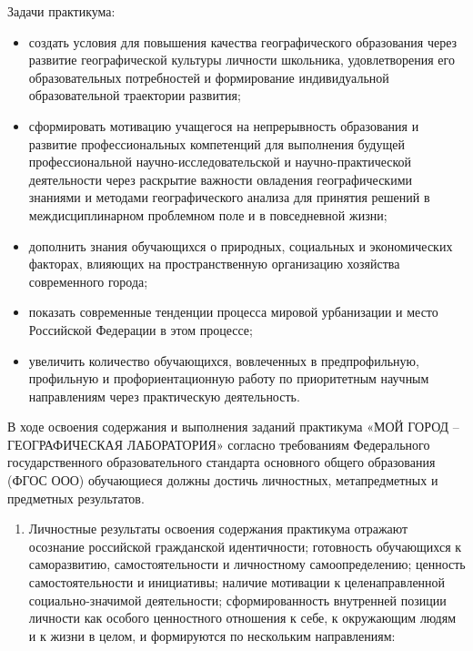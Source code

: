 \documentclass[
  11pt,
  russian,
]{book}
\providecommand{\tightlist}{%
  \setlength{\itemsep}{0pt}\setlength{\parskip}{0pt}}
\begin{document}
Задачи практикума:

\begin{itemize}
\item
  создать условия для повышения качества географического образования через развитие географической культуры личности школьника, удовлетворения его образовательных потребностей и формирование индивидуальной образовательной траектории развития;
\item
  сформировать мотивацию учащегося на непрерывность образования и развитие профессиональных компетенций для выполнения будущей профессиональной научно-исследовательской и научно-практической деятельности через раскрытие важности овладения географическими знаниями и методами географического анализа для принятия решений в междисциплинарном проблемном поле и в повседневной жизни;
\item
  дополнить знания обучающихся о природных, социальных и экономических факторах, влияющих на пространственную организацию хозяйства современного города;
\item
  показать современные тенденции процесса мировой урбанизации и место Российской Федерации в этом процессе;
\item
  увеличить количество обучающихся, вовлеченных в предпрофильную, профильную и профориентационную работу по приоритетным научным направлениям через практическую деятельность.
\end{itemize}

В ходе освоения содержания и выполнения заданий практикума «МОЙ ГОРОД -- ГЕОГРАФИЧЕСКАЯ ЛАБОРАТОРИЯ» согласно требованиям Федерального государственного образовательного стандарта основного общего образования (ФГОС ООО) обучающиеся должны достичь личностных, метапредметных и предметных результатов.

\begin{enumerate}
\def\labelenumi{\arabic{enumi}.}
\tightlist
\item
  Личностные результаты освоения содержания практикума отражают осознание российской гражданской идентичности; готовность обучающихся к саморазвитию, самостоятельности и личностному самоопределению; ценность самостоятельности и инициативы; наличие мотивации к целенаправленной социально-значимой деятельности; сформированность внутренней позиции личности как особого ценностного отношения к себе, к окружающим людям и к жизни в целом, и формируются по нескольким направлениям:
\end{enumerate}
\end{document}
